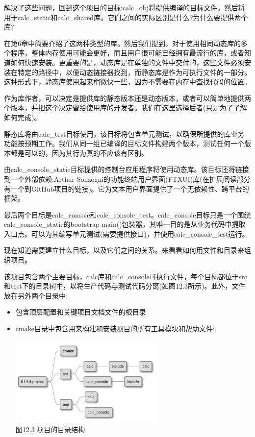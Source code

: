 解决了这些问题，回到这个项目的目标:calc\_obj将提供编译的目标文件，然后将用于calc\_static和calc\_shared库。它们之间的实际区别是什么?为什么要提供两个库?


在第6章中简要介绍了这两种类型的库。然后我们提到，对于使用相同动态库的多个程序，整体内存使用可能会更好，而且用户很可能已经拥有最流行的库，或者知道如何快速安装。更重要的是，动态库是在单独的文件中交付的，这些文件必须安装在特定的路径中，以便动态链接器找到，而静态库是作为可执行文件的一部分。这种形式下，静态库使用起来稍微快一些，因为不需要在内存中查找代码的位置。

作为库作者，可以决定是提供库的静态版本还是动态版本，或者可以简单地提供两个版本，并把这个决定留给使用库的开发者。我们在这里选择后者(只是为了了解如何完成)。

静态库将由calc\_test目标使用，该目标将包含单元测试，以确保所提供的库业务功能按预期工作。我们从同一组已编译的目标文件构建两个版本，测试任何一个版本都是可以的，因为其行为真的不应该有区别。

由calc\_console\_static目标提供的控制台应用程序将使用动态库。该目标还将链接到一个外部依赖:Arthur Sonzogni的功能终端用户界面(FTXUI)库(在扩展阅读部分有一个到GitHub项目的链接)。它为文本用户界面提供了一个无依赖性、跨平台的框架。

最后两个目标是calc\_console和calc\_console\_test。calc\_console目标只是一个围绕calc\_console\_static的bootstrap main()包装器，其唯一目的是从业务代码中提取入口点。可以为其编写单元测试(需要提供接口)，并使用calc\_console\_test运行。

现在知道需要建立什么目标，以及它们之间的关系。来看看如何用文件和目录来组织项目。


该项目包含两个主要目标，calc库和calc\_console可执行文件，每个目标都位于src和test下的目录树中，以将生产代码与测试代码分离(如图12.3所示)。此外，文件放在另外两个目录中:

\begin{itemize}
\item 
包含顶层配置和关键项目文档文件的根目录

\item 
cmake目录中包含用来构建和安装项目的所有工具模块和帮助文件:

\begin{center}
\includegraphics[width=0.6\textwidth]{content/3/chapter12/images/3.jpg}\\
图12.3 项目的目录结构
\end{center}
\end{itemize}

